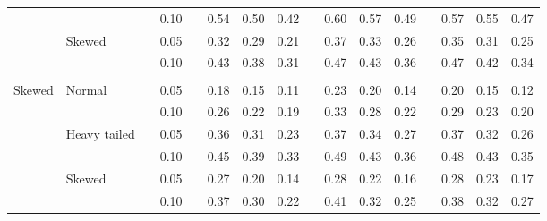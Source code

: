 \documentclass{article} %
\begin{document}
\begin{table}[ht]
\begin{scriptsize}
\begin{center}
\begin{tabular}{ll p{.1cm} c p{.1cm} rrr p{.1cm} rrr p{.1cm} rrr}
             &              && 0.10 &&   0.54 & 0.50 & 0.42 && 0.60 & 0.57 & 0.49 &&   0.57 & 0.55 & 0.47 \\
             & Skewed       && 0.05 &&   0.32 & 0.29 & 0.21 && 0.37 & 0.33 & 0.26 &&   0.35 & 0.31 & 0.25 \\
             &              && 0.10 &&   0.43 & 0.38 & 0.31 && 0.47 & 0.43 & 0.36 &&   0.47 & 0.42 & 0.34 \\
             &&&&&&&&&&&&&&&\\
Skewed       & Normal       && 0.05 &&   0.18 & 0.15 & 0.11 && 0.23 & 0.20 & 0.14 &&  0.20 & 0.15 & 0.12 \\ 
             &              && 0.10 &&   0.26 & 0.22 & 0.19 && 0.33 & 0.28 & 0.22 &&  0.29 & 0.23 & 0.20 \\ 
             & Heavy tailed && 0.05 &&   0.36 & 0.31 & 0.23 && 0.37 & 0.34 & 0.27 &&  0.37 & 0.32 & 0.26 \\ 
             &              && 0.10 &&   0.45 & 0.39 & 0.33 && 0.49 & 0.43 & 0.36 &&  0.48 & 0.43 & 0.35 \\ 
             & Skewed       && 0.05 &&   0.27 & 0.20 & 0.14 && 0.28 & 0.22 & 0.16 &&  0.28 & 0.23 & 0.17 \\ 
             &              && 0.10 &&   0.37 & 0.30 & 0.22 && 0.41 & 0.32 & 0.25 &&  0.38 & 0.32 & 0.27 \\ 




\end{tabular}
\end{center}
\end{scriptsize}
\end{table}
\end{document}
